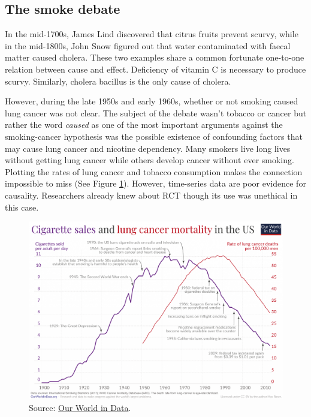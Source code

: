 \documentclass[
]{book}
\begin{document}
\hypertarget{smoke-debate}{%
\subsection{The smoke debate}\label{smoke-debate}}

In the mid-1700s, James Lind discovered that citrus fruits prevent scurvy, while in the mid-1800s, John Snow figured out that water contaminated with faecal matter caused cholera. These two examples share a common fortunate one-to-one relation between cause and effect. Deficiency of vitamin C is necessary to produce scurvy. Similarly, cholera bacillus is the only cause of cholera.

However, during the late 1950s and early 1960s, whether or not smoking caused lung cancer was not clear. The subject of the debate wasn't tobacco or cancer but rather the word \emph{caused} as one of the most important arguments against the smoking-cancer hypothesis was the possible existence of confounding factors that may cause lung cancer and nicotine dependency. Many smokers live long lives without getting lung cancer while others develop cancer without ever smoking. Plotting the rates of lung cancer and tobacco consumption makes the connection impossible to miss (See Figure \ref{fig:smoke-ts}). However, time-series data are poor evidence for causality. Researchers already knew about RCT though its use was unethical in this case.



\begin{figure}

{\centering \includegraphics[width=0.75\linewidth]{Figures/Smoking-and-lung-cancer-mortality-US-only} 

}

\caption{Source: \href{https://ourworldindata.org/smoking-big-problem-in-brief}{Our World in Data}.}\label{fig:smoke-ts}
\end{figure}
\end{document}
